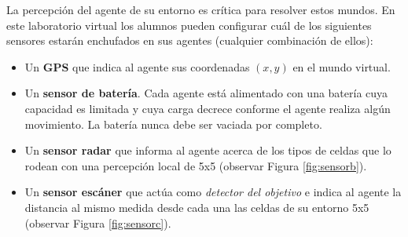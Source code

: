 La percepción del agente de su entorno es crítica para resolver estos mundos. En este laboratorio virtual los alumnos pueden configurar cuál de los siguientes sensores estarán enchufados en sus agentes (cualquier combinación de ellos):

\begin{itemize}
	\item Un \textbf{GPS} que indica al agente sus coordenadas $(x,y)$ en el mundo virtual.
	\item Un \textbf{sensor de batería}. Cada agente está alimentado con una batería cuya capacidad es limitada y cuya carga decrece conforme el agente realiza algún movimiento. La batería nunca debe ser vaciada por completo.
	\item Un \textbf{sensor radar} que informa al agente acerca de los tipos de celdas que lo rodean con una percepción local de 5x5 (observar Figura \ref{fig:sensorb}).
	\item Un \textbf{sensor escáner} que actúa como \emph{detector del objetivo} e indica al agente la distancia al mismo medida desde cada una las celdas de su entorno 5x5 (observar Figura \ref{fig:sensorc}).
\end{itemize}

